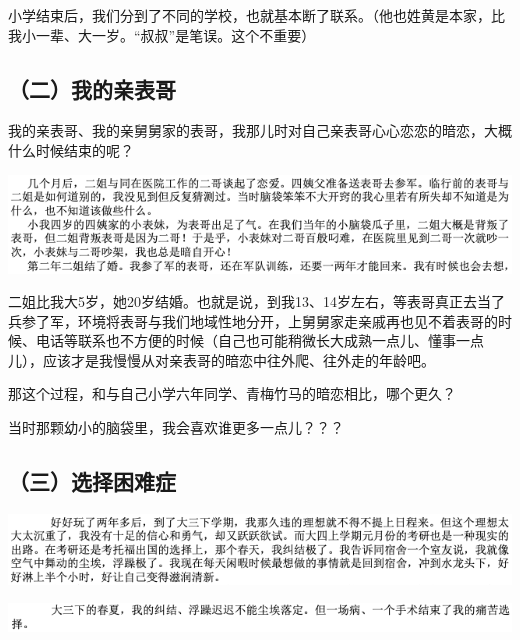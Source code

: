 \documentclass[9pt, b5paper]{article}
\begin{document}
小学结束后，我们分到了不同的学校，也就基本断了联系。（他也姓黄是本家，比我小一辈、大一岁。“叔叔”是笔误。这个不重要）

\subsection{（二）我的亲表哥}
\label{sec:org8c1ef01}

我的亲表哥、我的亲舅舅家的表哥，我那儿时对自己亲表哥心心恋恋的暗恋，大概什么时候结束的呢？

\begin{center}
\includegraphics[width=.9\linewidth]{./pic/backups_plans_20210422_163858.png}
\end{center}

二姐比我大5岁，她20岁结婚。也就是说，到我13、14岁左右，等表哥真正去当了兵参了军，环境将表哥与我们地域性地分开，上舅舅家走亲戚再也见不着表哥的时候、电话等联系也不方便的时候（自己也可能稍微长大成熟一点儿、懂事一点儿），应该才是我慢慢从对亲表哥的暗恋中往外爬、往外走的年龄吧。

那这个过程，和与自己小学六年同学、青梅竹马的暗恋相比，哪个更久？

当时那颗幼小的脑袋里，我会喜欢谁更多一点儿？？？

\subsection{（三）选择困难症}
\label{sec:org26cc2f2}

\begin{center}
\includegraphics[width=.9\linewidth]{./pic/backups_plans_20210422_164406.png}
\end{center}

\begin{center}
\includegraphics[width=.9\linewidth]{./pic/backups_plans_20210422_164435.png}
\end{center}
\end{document}
